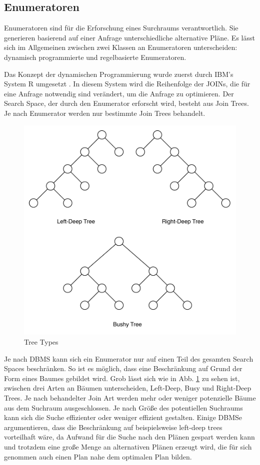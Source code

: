 \subsection{Enumeratoren}



Enumeratoren sind für die Erforschung eines Surchraums verantwortlich. Sie generieren basierend auf einer Anfrage unterschiedliche alternative Pläne. Es lässt sich im Allgemeinen zwischen zwei Klassen an Enumeratoren unterscheiden: dynamisch programmierte und regelbasierte Enumeratoren.  

Das Konzept der dynamischen Programmierung wurde zuerst durch IBM's System R umgesetzt \cite{selinger1979access}. In diesem System wird die Reihenfolge der JOINs, die für eine Anfrage notwendig sind verändert, um die Anfrage zu optimieren. Der Search Space, der durch den Enumerator erforscht wird, besteht aus Join Trees. Je nach Enumerator werden nur bestimmte Join Trees behandelt.


\begin{figure}[h]
  \centering
  \includegraphics[width=\textwidth]{02_Grundlagen/TreeTypes.pdf}
  \caption{Tree Types}
  \label{TreeTypes}
\end{figure}

Je nach \ac{DBMS} kann sich ein Enumerator nur auf einen Teil des gesamten Search Spaces beschränken. So ist es möglich, dass eine Beschränkung auf Grund der Form eines Baumes gebildet wird. Grob lässt sich wie in Abb. \ref{TreeTypes} zu sehen ist, zwischen drei Arten an Bäumen unterscheiden, Left-Deep, Busy und Right-Deep Trees. Je nach behandelter Join Art werden mehr oder weniger potenzielle Bäume aus dem Suchraum ausgeschlossen. Je nach Größe des potentiellen Suchraums kann sich die Suche effizienter oder weniger effizient gestalten. Einige \ac{DBMS}e argumentieren, dass die Beschränkung auf beispielsweise left-deep trees vorteilhaft wäre, da Aufwand für die Suche nach den Plänen gespart werden kann und trotzdem eine große Menge an alternativen Plänen erzeugt wird, die für sich genommen auch einen Plan nahe dem optimalen Plan bilden. 